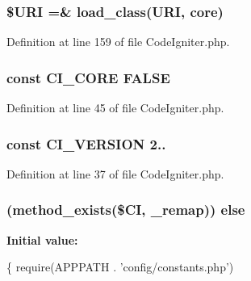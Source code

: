 \subsubsection[{\texorpdfstring{\$\+U\+RI}{$URI}}]{\setlength{\rightskip}{0pt plus 5cm}\$U\+RI =\& load\+\_\+class(\textquotesingle{}U\+RI\textquotesingle{}, \textquotesingle{}core\textquotesingle{})}\hypertarget{_code_igniter_8php_a630d83d898b39ad4568906284f7f5336}{}\label{_code_igniter_8php_a630d83d898b39ad4568906284f7f5336}


Definition at line 159 of file Code\+Igniter.\+php.

\subsubsection[{\texorpdfstring{C\+I\+\_\+\+C\+O\+RE}{CI_CORE}}]{\setlength{\rightskip}{0pt plus 5cm}const C\+I\+\_\+\+C\+O\+RE F\+A\+L\+SE}\hypertarget{_code_igniter_8php_aefc9cd12024bd0164da3aeafe9635c30}{}\label{_code_igniter_8php_aefc9cd12024bd0164da3aeafe9635c30}


Definition at line 45 of file Code\+Igniter.\+php.

\subsubsection[{\texorpdfstring{C\+I\+\_\+\+V\+E\+R\+S\+I\+ON}{CI_VERSION}}]{\setlength{\rightskip}{0pt plus 5cm}const C\+I\+\_\+\+V\+E\+R\+S\+I\+ON \textquotesingle{}2..\textquotesingle{}}\hypertarget{_code_igniter_8php_a32e3c3927ba8ec93df92327dfd85d564}{}\label{_code_igniter_8php_a32e3c3927ba8ec93df92327dfd85d564}


Definition at line 37 of file Code\+Igniter.\+php.

\subsubsection[{\texorpdfstring{else}{else}}]{ (method\+\_\+exists(\$CI, \textquotesingle{}\+\_\+remap\textquotesingle{})) else}\hypertarget{_code_igniter_8php_a92382071610da06a8cb62a44c4530e10}{}\label{_code_igniter_8php_a92382071610da06a8cb62a44c4530e10}
{\bfseries Initial value\+:}
\begin{DoxyCode}
\{
    require(APPPATH . \textcolor{stringliteral}{'config/constants.php'})
\end{DoxyCode}


